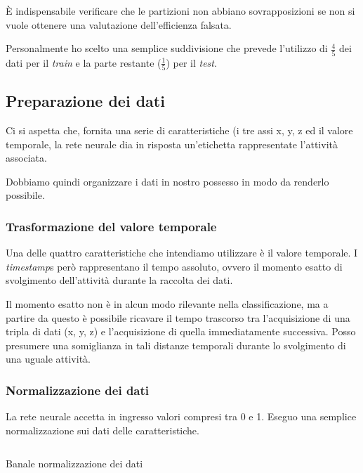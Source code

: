 È indispensabile verificare che le partizioni non abbiano sovrapposizioni se non si vuole ottenere una valutazione dell'efficienza falsata.

\vspace{5mm} %

Personalmente ho scelto una semplice suddivisione che prevede l'utilizzo di $\frac{4}{5}$ dei dati per il \textit{train} e 
la parte restante ($\frac{1}{5}$) per il \textit{test}.


\subsection{Preparazione dei dati}
Ci si aspetta che, fornita una serie di caratteristiche (i tre assi x, y, z ed il valore temporale, 
la rete neurale dia in risposta un'etichetta rappresentate l'attività associata.

\vspace{5mm} %

Dobbiamo quindi organizzare i dati in nostro possesso in modo da renderlo possibile.

\subsubsection{Trasformazione del valore temporale}
Una delle quattro caratteristiche che intendiamo utilizzare è il valore temporale.
I \textit{timestamp}s però rappresentano il tempo assoluto, 
ovvero il momento esatto di svolgimento dell'attività durante la raccolta dei dati.

Il momento esatto non è in alcun modo rilevante nella classificazione, ma a partire da questo è possibile ricavare il tempo trascorso 
tra l'acquisizione di una tripla di dati (x, y, z) e l'acquisizione di quella immediatamente successiva.
Posso presumere una somiglianza in tali distanze temporali durante lo svolgimento di una uguale attività.

\subsubsection{Normalizzazione dei dati}
La rete neurale accetta in ingresso valori compresi tra 0 e 1. Eseguo una semplice normalizzazione sui dati delle caratteristiche.
\begin{listing}[H] 
    \inputminted[frame=single,framesep=10pt]{python}{snippets/classifier/normalize_data.py}
    \caption{Banale normalizzazione dei dati}
\end{listing}

